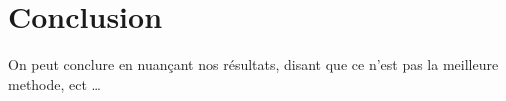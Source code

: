 \section{Conclusion}
On peut conclure en nuançant nos résultats, disant que ce n'est pas la meilleure methode, ect \dots